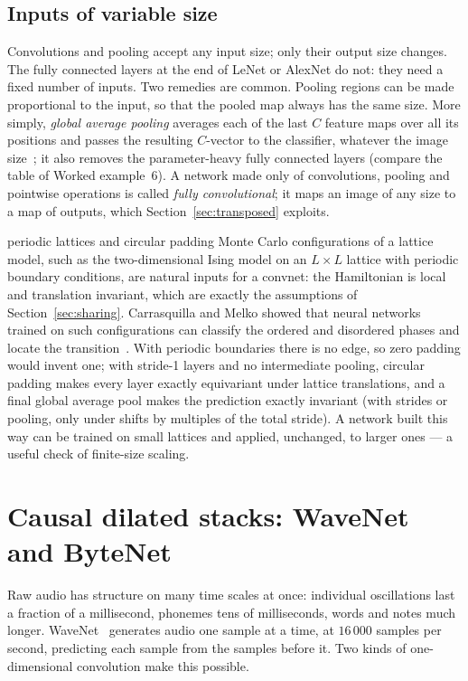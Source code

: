 \documentclass[11pt]{article}
\begin{document}
\subsection{Inputs of variable size}

Convolutions and pooling accept any input size; only their output size changes. The fully connected layers at the end of
LeNet or AlexNet do not: they need a fixed number of inputs. Two remedies are common. Pooling regions can be made
proportional to the input, so that the pooled map always has the same size. More simply, \emph{global average pooling}
averages each of the last $C$ feature maps over all its positions and passes the resulting $C$-vector to the classifier,
whatever the image size~\cite{lin2014}; it also removes the parameter-heavy fully connected layers (compare the table of
Worked example~6). A network made only of convolutions, pooling and pointwise operations is called \emph{fully
convolutional}; it maps an image of any size to a map of outputs, which Section~\ref{sec:transposed} exploits.

\begin{physics}{periodic lattices and circular padding}
Monte Carlo configurations of a lattice model, such as the two-dimensional Ising model on an $L \times L$ lattice with
periodic boundary conditions, are natural inputs for a convnet: the Hamiltonian is local and translation invariant, which
are exactly the assumptions of Section~\ref{sec:sharing}. Carrasquilla and Melko showed that neural networks trained on
such configurations can classify the ordered and disordered phases and locate the transition~\cite{carrasquilla2017}.
With periodic boundaries there is no edge, so zero padding would invent one; with stride-1 layers and no intermediate
pooling, circular padding makes every layer exactly equivariant under lattice translations, and a final global average
pool makes the prediction exactly invariant (with strides or pooling, only under shifts by multiples of the total
stride). A network
built this way can be trained on small lattices and applied, unchanged, to larger ones --- a useful check of finite-size
scaling.
\end{physics}

\section{Causal dilated stacks: WaveNet and ByteNet}\label{sec:dilated}

Raw audio has structure on many time scales at once: individual oscillations last a fraction of a millisecond, phonemes
tens of milliseconds, words and notes much longer. WaveNet~\cite{vandenoord2016} generates audio one sample at a time, at
$16\,000$ samples per second, predicting each sample from the samples before it. Two kinds of one-dimensional
convolution make this possible.
\end{document}
